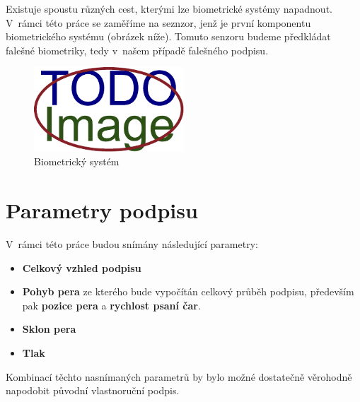 Existuje spoustu různých cest, kterými lze biometrické systémy napadnout.                                   %
V~rámci této práce se zaměříme na seznzor, jenž je první komponentu biometrického systému (obrázek níže).   %
Tomuto senzoru budeme předkládat falešné biometriky, tedy v~našem případě falešného podpisu.                %

\begin{figure}[h]
\centering
\includegraphics[width=0.5\textwidth]{obrazky-figures/placeholder.pdf}
\caption{Biometrický systém}
\label{fig:my-pdf}
\end{figure}

\section{Parametry podpisu}
V~rámci této práce budou snímány následující parametry:
\begin{itemize}
  \item{\textbf{Celkový vzhled podpisu}}
  \item{\textbf{Pohyb pera} ze kterého bude vypočítán celkový průběh podpisu, především pak \textbf{pozice pera} a \textbf{rychlost psaní čar}.} %
  \item{\textbf{Sklon pera}} %
  \item{\textbf{Tlak}} %
\end{itemize}
Kombinací těchto nasnímaných parametrů by bylo možné dostatečně věrohodně napodobit původní vlastnoruční podpis. 

